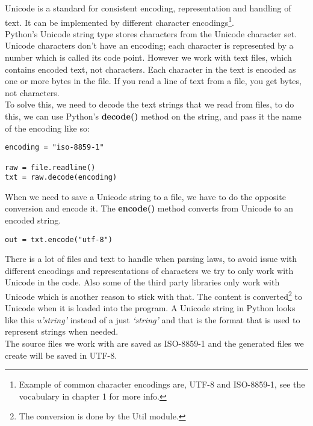 Unicode is a standard for consistent encoding, representation and handling of text. It can be implemented by different character encodings\footnote{Example of common character encodings are, UTF-8 and ISO-8859-1, see the vocabulary in chapter 1 for more info.}.\\
Python’s Unicode string type stores characters from the Unicode character set. Unicode characters don’t have an encoding; each character is represented by a number which is called its code point. However we work with text files, which contains encoded text, not characters. Each character in the text is encoded as one or more bytes in the file. If you read a line of text from a file, you get bytes, not characters.\\
To solve this, we need to decode the text strings that we read from files, to do this, we can use Python’s \textbf{decode()} method on the string, and pass it the name of the encoding like so:\\

\begin{verbatim}
encoding = "iso-8859-1"

raw = file.readline()
txt = raw.decode(encoding)
\end{verbatim}
\linebreak
\newline
When we need to save a Unicode string to a file, we have to do the opposite conversion and encode it. The \textbf{encode()} method converts from Unicode to an encoded string.\\
\begin{verbatim}
out = txt.encode("utf-8")
\end{verbatim}
\linebreak
\newline
There is a lot of files and text to handle when parsing laws, to avoid issue with different encodings and representations of characters we try to only work with Unicode in the code. Also some of the third party libraries only work with Unicode which is another reason to stick with that. The content is converted\footnote{The conversion is done by the Util module.} to Unicode when it is loaded into the program. A Unicode string in Python looks like this \textit{u'string'} instead of a just \textit{‘string’} and that is the format that is used to represent strings when needed.\\
The source files we work with are saved as ISO-8859-1 and the generated files we create will be saved in UTF-8. 

